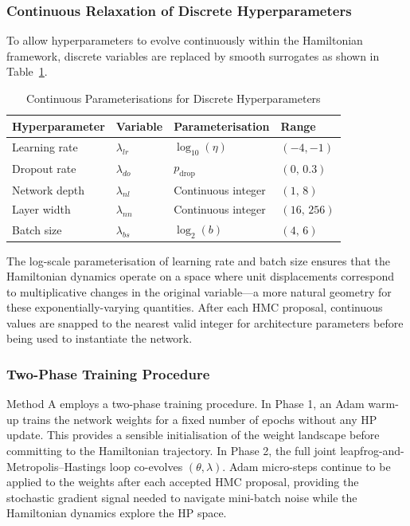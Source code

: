 \documentclass[11pt]{article}
\begin{document}
\subsubsection{Continuous Relaxation of Discrete Hyperparameters}

To allow hyperparameters to evolve continuously within the Hamiltonian
framework, discrete variables are replaced by smooth surrogates as
shown in Table~\ref{tab:hpparam}.

\begin{table}[H]
\centering
\caption{Continuous Parameterisations for Discrete Hyperparameters}
\label{tab:hpparam}
\renewcommand{\arraystretch}{1.2}
\begin{tabular}{llll}
\toprule
Hyperparameter & Variable & Parameterisation & Range \\
\midrule
Learning rate  & $\lambda_{lr}$ & $\log_{10}(\eta)$    & $(-4,-1)$ \\
Dropout rate   & $\lambda_{do}$ & $p_{\mathrm{drop}}$  & $(0,\,0.3)$ \\
Network depth  & $\lambda_{nl}$ & Continuous integer   & $(1,\,8)$ \\
Layer width    & $\lambda_{nn}$ & Continuous integer   & $(16,\,256)$ \\
Batch size     & $\lambda_{bs}$ & $\log_2(b)$          & $(4,\,6)$ \\
\bottomrule
\end{tabular}
\end{table}

The log-scale parameterisation of learning rate and batch size ensures
that the Hamiltonian dynamics operate on a space where unit displacements
correspond to multiplicative changes in the original variable—a more
natural geometry for these exponentially-varying quantities.  After
each HMC proposal, continuous values are snapped to the nearest valid
integer for architecture parameters before being used to instantiate
the network.

\subsubsection{Two-Phase Training Procedure}

Method A employs a two-phase training procedure.  In Phase 1, an Adam
warm-up trains the network weights for a fixed number of epochs without
any HP update.  This provides a sensible initialisation of the weight
landscape before committing to the Hamiltonian trajectory.  In Phase 2,
the full joint leapfrog-and-Metropolis--Hastings loop co-evolves
$(\theta, \lambda)$.  Adam micro-steps continue to be applied to the
weights after each accepted HMC proposal, providing the stochastic
gradient signal needed to navigate mini-batch noise while the
Hamiltonian dynamics explore the HP space.
\end{document}
